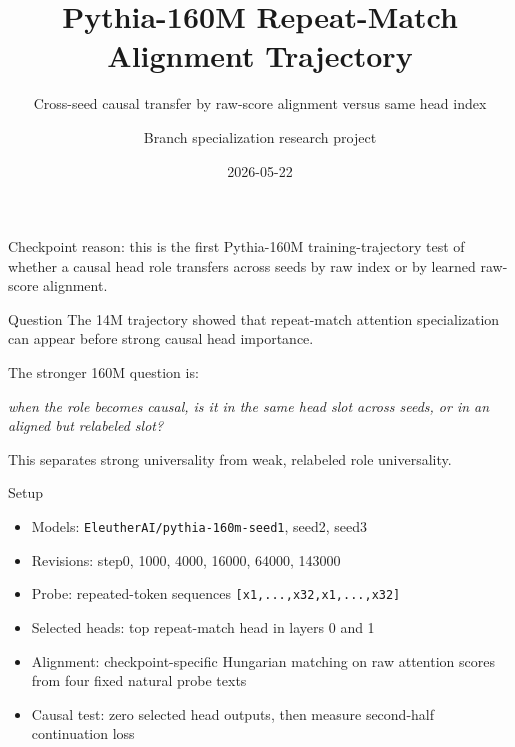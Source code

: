 \documentclass[aspectratio=169]{beamer}
\title[Pythia-160M Alignment Trajectory]{Pythia-160M Repeat-Match Alignment Trajectory}
\subtitle{Cross-seed causal transfer by raw-score alignment versus same head index}
\author{Branch specialization research project}
\date{2026-05-22}
\begin{document}
\begin{frame}
  \titlepage
  \vspace{-0.5em}
  \small
  Checkpoint reason: this is the first Pythia-160M training-trajectory test of
  whether a causal head role transfers across seeds by raw index or by learned
  raw-score alignment.
\end{frame}

\begin{frame}{Question}
  The 14M trajectory showed that repeat-match attention specialization can
  appear before strong causal head importance.

  \vspace{0.8em}
  The stronger 160M question is:

  \vspace{0.5em}
  \begin{center}
  \textit{when the role becomes causal, is it in the same head slot across
  seeds, or in an aligned but relabeled slot?}
  \end{center}

  \vspace{0.8em}
  This separates strong universality from weak, relabeled role universality.
\end{frame}

\begin{frame}{Setup}
  \begin{itemize}
    \item Models: \texttt{EleutherAI/pythia-160m-seed1}, seed2, seed3
    \item Revisions: step0, 1000, 4000, 16000, 64000, 143000
    \item Probe: repeated-token sequences \texttt{[x1,...,x32,x1,...,x32]}
    \item Selected heads: top repeat-match head in layers 0 and 1
    \item Alignment: checkpoint-specific Hungarian matching on raw attention
    scores from four fixed natural probe texts
    \item Causal test: zero selected head outputs, then measure second-half
    continuation loss
  \end{itemize}
\end{frame}
\end{document}
